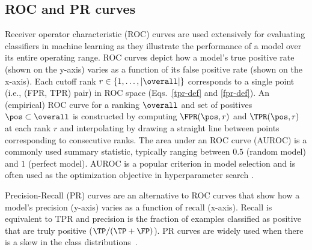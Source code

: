 \subsection{ROC and PR curves} \label{roc}
Receiver operator characteristic (ROC) curves are used extensively for evaluating classifiers in machine learning \citep{Bradley:1997:UAU:1746432.1746434} as they illustrate the performance of a model over its entire operating range. ROC curves depict how a model's true positive rate (shown on the y-axis) varies as a function of its false positive rate (shown on the x-axis). Each cutoff rank $r \in \{1,\ldots,|\overall|\}$ corresponds to a single point (i.e., (FPR, TPR) pair) in ROC space (Eqs.~\eqref{tpr-def} and \eqref{fpr-def}). An (empirical) ROC curve for a ranking $\overall$ and set of positives $\pos \subset \overall$ is constructed by computing $\FPR(\pos, r)$ and $\TPR(\pos, r)$ at each rank $r$ and interpolating by drawing a straight line between points corresponding to consecutive ranks.  
The area under an ROC curve (AUROC) is a commonly used summary statistic, typically ranging between $0.5$ (random model) and $1$ (perfect model). AUROC is a popular  criterion in model selection and is often used as the optimization objective in hyperparameter search \citep{Bradley:1997:UAU:1746432.1746434}.




Precision-Recall (PR) curves  \citep{davis2006relationship} are an alternative to ROC curves that show how a model's precision (y-axis) varies as a function of recall (x-axis). Recall is equivalent to TPR and precision is the fraction of examples classified as
positive that are truly positive ($\TP / (\TP+\FP)$). PR curves are widely used when there is a skew in the class distributions~\cite{davis-icml09,claesen2014robust}.



